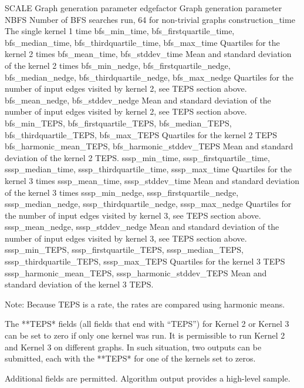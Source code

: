 \documentclass{article}
\begin{document}
SCALE Graph generation parameter edgefactor Graph generation parameter NBFS Number of BFS searches run, 64 for non-trivial graphs construction\_time The single kernel 1 time bfs\_min\_time, bfs\_firstquartile\_time, bfs\_median\_time, bfs\_thirdquartile\_time, bfs\_max\_time Quartiles for the kernel 2 times bfs\_mean\_time, bfs\_stddev\_time Mean and standard deviation of the kernel 2 times bfs\_min\_nedge, bfs\_firstquartile\_nedge, bfs\_median\_nedge, bfs\_thirdquartile\_nedge, bfs\_max\_nedge Quartiles for the number of input edges visited by kernel 2, see TEPS section above. bfs\_mean\_nedge, bfs\_stddev\_nedge Mean and standard deviation of the number of input edges visited by kernel 2, see TEPS section above. bfs\_min\_TEPS, bfs\_firstquartile\_TEPS, bfs\_median\_TEPS, bfs\_thirdquartile\_TEPS, bfs\_max\_TEPS Quartiles for the kernel 2 TEPS bfs\_harmonic\_mean\_TEPS, bfs\_harmonic\_stddev\_TEPS Mean and standard deviation of the kernel 2 TEPS. sssp\_min\_time, sssp\_firstquartile\_time, sssp\_median\_time, sssp\_thirdquartile\_time, sssp\_max\_time Quartiles for the kernel 3 times sssp\_mean\_time, sssp\_stddev\_time Mean and standard deviation of the kernel 3 times sssp\_min\_nedge, sssp\_firstquartile\_nedge, sssp\_median\_nedge, sssp\_thirdquartile\_nedge, sssp\_max\_nedge Quartiles for the number of input edges visited by kernel 3, see TEPS section above. sssp\_mean\_nedge, sssp\_stddev\_nedge Mean and standard deviation of the number of input edges visited by kernel 3, see TEPS section above. sssp\_min\_TEPS, sssp\_firstquartile\_TEPS, sssp\_median\_TEPS, sssp\_thirdquartile\_TEPS, sssp\_max\_TEPS Quartiles for the kernel 3 TEPS sssp\_harmonic\_mean\_TEPS, sssp\_harmonic\_stddev\_TEPS Mean and standard deviation of the kernel 3 TEPS.

Note: Because TEPS is a rate, the rates are compared using harmonic means.

The **TEPS* fields (all fields that end with ``TEPS'') for Kernel 2 or Kernel 3 can be set to zero if only one kernel was run. It is permissible to run Kernel 2 and Kernel 3 on different graphs. In such situation, two outputs can be submitted, each with the **TEPS* for one of the kernels set to zeros.

Additional fields are permitted. Algorithm output provides a high-level sample.
\end{document}
